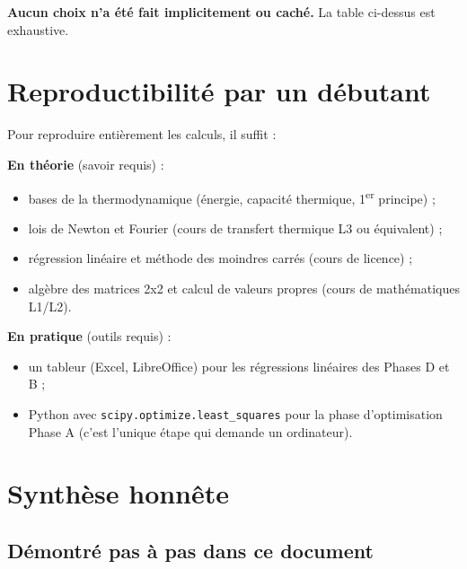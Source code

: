 \documentclass[11pt,a4paper]{article}
\begin{document}
\textbf{Aucun choix n'a été fait implicitement ou caché.} La table ci-dessus est exhaustive.

\section{Reproductibilité par un débutant}

Pour reproduire entièrement les calculs, il suffit :

\textbf{En théorie} (savoir requis) :
\begin{itemize}[itemsep=0pt]
\item bases de la thermodynamique (énergie, capacité thermique, 1\textsuperscript{er} principe) ;
\item lois de Newton et Fourier (cours de transfert thermique L3 ou équivalent) ;
\item régression linéaire et méthode des moindres carrés (cours de licence) ;
\item algèbre des matrices 2x2 et calcul de valeurs propres (cours de mathématiques L1/L2).
\end{itemize}

\textbf{En pratique} (outils requis) :
\begin{itemize}[itemsep=0pt]
\item un tableur (Excel, LibreOffice) pour les régressions linéaires des Phases D et B ;
\item Python avec \verb|scipy.optimize.least_squares| pour la phase d'optimisation Phase A
(c'est l'unique étape qui demande un ordinateur).
\end{itemize}

\section{Synthèse honnête}

\subsection{Démontré pas à pas dans ce document}
\end{document}
